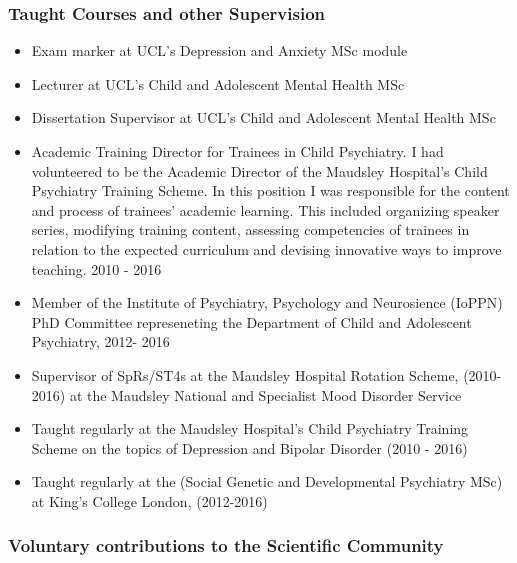 \documentclass[
]{article}
\begin{document}
\hypertarget{taught-courses-and-other-supervision}{%
\subsubsection{Taught Courses and other
Supervision}\label{taught-courses-and-other-supervision}}

\begin{itemize}
\item
  Exam marker at UCL's Depression and Anxiety MSc module
\item
  Lecturer at UCL's Child and Adolescent Mental Health MSc
\item
  Dissertation Supervisor at UCL's Child and Adolescent Mental Health
  MSc
\item
  Academic Training Director for Trainees in Child Psychiatry. I had
  volunteered to be the Academic Director of the Maudsley Hospital's
  Child Psychiatry Training Scheme. In this position I was responsible
  for the content and process of trainees' academic learning. This
  included organizing speaker series, modifying training content,
  assessing competencies of trainees in relation to the expected
  curriculum and devising innovative ways to improve teaching. 2010 -
  2016
\item
  Member of the Institute of Psychiatry, Psychology and Neurosience
  (IoPPN) PhD Committee represeneting the Department of Child and
  Adolescent Psychiatry, 2012- 2016
\item
  Supervisor of SpRs/ST4s at the Maudsley Hospital Rotation Scheme,
  (2010-2016) at the Maudsley National and Specialist Mood Disorder
  Service
\item
  Taught regularly at the Maudsley Hospital's Child Psychiatry Training
  Scheme on the topics of Depression and Bipolar Disorder (2010 - 2016)
\item
  Taught regularly at the (Social Genetic and Developmental Psychiatry
  MSc) at King's College London, (2012-2016)
\end{itemize}

\hypertarget{voluntary-contributions-to-the-scientific-community}{%
\subsubsection{Voluntary contributions to the Scientific
Community}\label{voluntary-contributions-to-the-scientific-community}}
\end{document}
